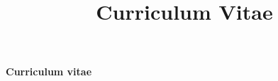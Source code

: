 \documentclass[a4paper,10pt]{curve}
\title{Curriculum Vitae}
\begin{document}
            \makeheaders[t]
            \hspace{-1cm}
            \vspace{-1cm}
            \begin{center}
            {\Huge\textbf{Curriculum vitae}}
            \end{center}
            \vfill
            
            
\end{document}
